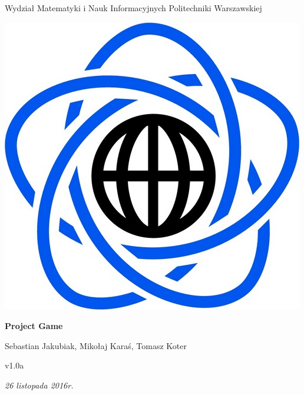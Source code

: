\documentclass[11pt]{article}
\begin{document}
\begin{titlepage}
\centering

{\large Wydział Matematyki i Nauk Informacyjnych Politechniki Warszawskiej}

\vspace{1cm}
\includegraphics[scale=0.15]{logo}
\vspace{3cm}

{\Huge\bfseries Project Game}

\vspace{1cm}

{\Large Sebastian Jakubiak, Mikołaj Karaś, Tomasz Koter}

\vspace{1cm}

{\large v1.0a}

\vspace{1cm}

\vfill

{\itshape {\large 26 listopada 2016r.}}
\end{titlepage}

\tableofcontents


\begin{table}[!h]
\centering
\def\arraystretch{2}%
\caption{Lista zmian}

\end{table}
\end{document}
